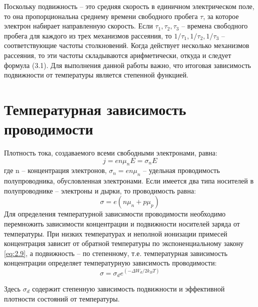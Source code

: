 Поскольку подвижность – это средняя скорость в единичном электрическом поле, то она пропорциональна среднему времени
свободного пробега $\tau$, за которое электрон набирает направленную скорость. Если $\tau_1, \tau_2,\tau_3$ – времена свободного
пробега для каждого из трех механизмов рассеяния, то $1/\tau_1,1/\tau_2,1/\tau_3$ – соответствующие частоты столкновений. Когда
действует несколько механизмов рассеяния, то эти частоты складываются арифметически, откуда и следует формула (3.1). Для
выполнения данной работы важно, что итоговая зависимость подвижности от температуры является степенной функцией.

\section{Температурная зависимость проводимости}
Плотность тока, создаваемого всеми свободными электронами, равна:
\begin{equation}
	j=e n \mu_{n} E=\sigma_{n} E
	\label{eq:4.1}
\end{equation}
где n – концентрация электронов, $\sigma_n = e n \mu_n$ – удельная проводимость полупроводника, обусловленная электронами.
Если имеется два типа носителей в полупроводнике – электроны и дырки,
то проводимость равна:
\begin{equation}
	\sigma=e\left(n \mu_{n}+p \mu_{p}\right)
	\label{eq:4.2}
\end{equation}
Для определения температурной зависимости проводимости необходимо перемножить зависимости концентрации и подвижности носителей заряда от
температуры. При низких температурах и неполной ионизации примесей концентрация зависит от обратной температуры по экспоненциальному закону
\eqref{eq:2.9}, а подвижность – по степенному, т.е. температурная зависимость концентрации определяет температурную зависимость проводимости:
\begin{equation}
	\sigma=\sigma_{d} e^{\left(-\Delta W_{d} / 2 k_{B} T\right)}
	\label{eq:4.3}
\end{equation}

Здесь $\sigma_d$ содержит степенную зависимость подвижности и эффективной плотности состояний от температуры.

